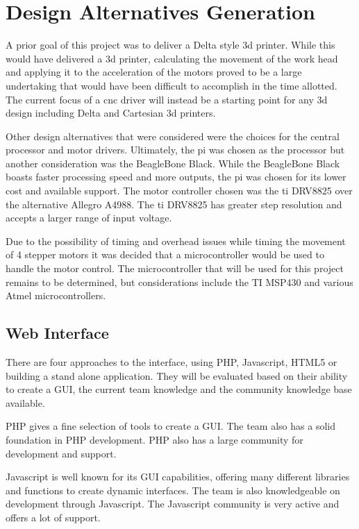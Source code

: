 \chapter{Design Alternatives Generation}
A prior goal of this project was to deliver a Delta style \gls{3d} printer.
While this would have delivered a \gls{3d} printer, calculating the movement of the work head and applying it to the acceleration of the motors proved to be a large undertaking that would have been difficult to accomplish in the time allotted.
The current focus of a \gls{cnc} driver will instead be a starting point for any \gls{3d} design including Delta and Cartesian \gls{3d} printers.

Other design alternatives that were considered were the choices for the central processor and motor drivers.
Ultimately, the \gls{pi} was chosen as the processor but another consideration was the BeagleBone Black.
While the BeagleBone Black boasts faster processing speed and more outputs, the \gls{pi} was chosen for its lower cost and available support.
The motor controller chosen was the \gls{ti} DRV8825 over the alternative Allegro A4988. The \gls{ti} DRV8825 has greater step resolution and accepts a larger range of input voltage.

Due to the possibility of timing and overhead issues while timing the movement of 4 stepper motors it was decided that a microcontroller would be used to handle the motor control.
The microcontroller that will be used for this project remains to be determined, but considerations include the TI MSP430 and various Atmel microcontrollers.

\section{Web Interface}
There are four approaches to the interface, using PHP, Javascript, HTML5 or building a stand alone application.
They will be evaluated based on their ability to create a GUI, the current team knowledge and the community knowledge base available. 

PHP gives a fine selection of tools to create a GUI.
The team also has a solid foundation in PHP development.
PHP also has a large community for development and support.

Javascript is well known for its GUI capabilities, offering many different libraries and functions to create dynamic interfaces. 
The team is also knowledgeable on development through Javascript.
The Javascript community is very active and offers a lot of support.

